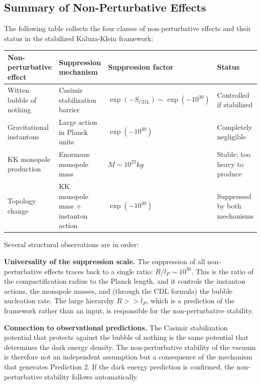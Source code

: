 \documentclass[aps,prd,preprint,superscriptaddress,longbibliography,floatfix]{revtex4-2}
\theoremstyle{remark}
\begin{document}
\subsection{Summary of Non-Perturbative Effects}

The following table collects the four classes of non-perturbative effects and their status in the stabilized Kaluza-Klein framework:


\begin{table}[H]
\begin{ruledtabular}
\begin{tabular}{p{3.8cm}p{3.8cm}p{3.8cm}p{3.8cm}}
Non-perturbative effect & Suppression mechanism & Suppression factor & Status \\
\hline
Witten bubble of nothing & Casimir stabilization barrier & $\exp(-S_{CDL}) \sim  \exp(-10^{30})$ & Controlled if stabilized \\
Gravitational instantons & Large action in Planck units & $\exp(-10^{30})$ & Completely negligible \\
KK monopole production & Enormous monopole mass & $M \sim  10^{22} kg$ & Stable; too heavy to produce \\
Topology change & KK monopole mass + instanton action & $\exp(-10^{30})$ & Suppressed by both mechanisms \\
\end{tabular}
\end{ruledtabular}
\end{table}

Several structural observations are in order:

\textbf{Universality of the suppression scale.} The suppression of all non-perturbative effects traces back to a single ratio: $R/l_P \sim  10^{30}$. This is the ratio of the compactification radius to the Planck length, and it controls the instanton actions, the monopole masses, and (through the CDL formula) the bubble nucleation rate. The large hierarchy $R >> l_P$, which is a prediction of the framework rather than an input, is responsible for the non-perturbative stability.

\textbf{Connection to observational predictions.} The Casimir stabilization potential that protects against the bubble of nothing is the same potential that determines the dark energy density. The non-perturbative stability of the vacuum is therefore not an independent assumption but a consequence of the mechanism that generates Prediction 2. If the dark energy prediction is confirmed, the non-perturbative stability follows automatically.
\end{document}
